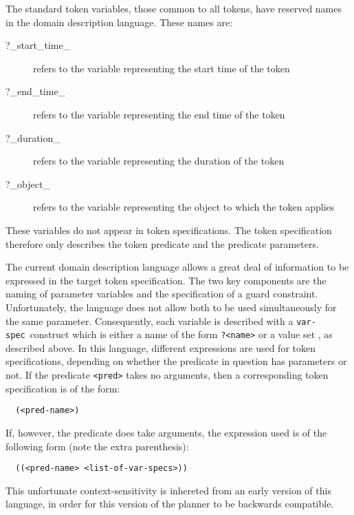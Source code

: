 The standard token variables, those common to all tokens, have
reserved names in the domain description language. These names are:
  \begin{description}
  \item[?\_start\_time\_] refers to the variable representing the start 
  time of the token
  \item[?\_end\_time\_] refers to the variable representing the end 
  time of the token
  \item[?\_duration\_] refers to the variable representing the duration 
  of the token
  \item[?\_object\_] refers to the variable representing the object to 
  which the token applies
  \end{description}
  These variables do not appear in token specifications.  The token
specification therefore only describes the token predicate and the
predicate parameters.

The current domain description language allows a great deal of
information to be expressed in the target token specification.  The
two key components are the naming of parameter variables and the
specification of a guard constraint.  Unfortunately, the language does
not allow both to be used simultaneously for the same parameter. 
Consequently, each variable is described with a {\tt var-spec}\
construct which is either a name of the form {\tt ?<name>} or a value
set {\tt <value-set>}, as described above.  In this language,
different expressions are used for token specifications, depending on
whether the predicate in question has parameters or not.  If the
predicate {\tt <pred>} takes no arguments, then a corresponding token
specification is of the form:
  \begin{verbatim}
  (<pred-name>) \end{verbatim}
  If, however, the predicate does take arguments, the expression used
is of the following form (note the extra parenthesis):
  \begin{verbatim}
  ((<pred-name> <list-of-var-specs>)) \end{verbatim}
  This unfortunate context-sensitivity is inhereted from an early
version of this language, in order for this version of the planner to
be backwards compatible.


